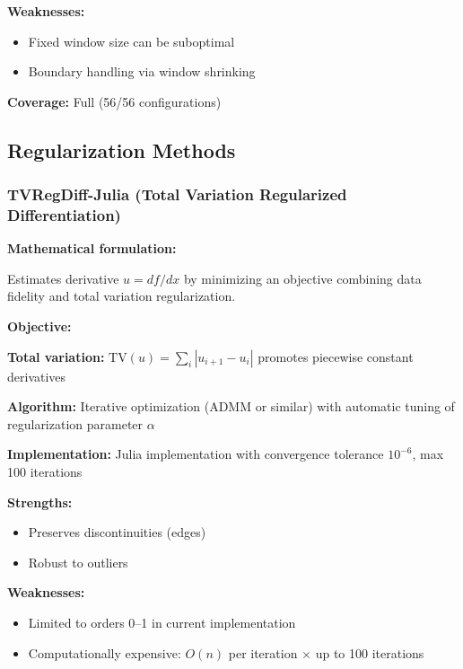 \textbf{Weaknesses:}
\begin{itemize}
    \item Fixed window size can be suboptimal
    \item Boundary handling via window shrinking
\end{itemize}

\textbf{Coverage:} Full (56/56 configurations)

\subsection{Regularization Methods}
\label{sec:regularization}

\subsubsection{TVRegDiff-Julia (Total Variation Regularized Differentiation)}

\textbf{Mathematical formulation:}

Estimates derivative $u = df/dx$ by minimizing an objective combining data fidelity and total variation regularization.

\textbf{Objective:} 

\textbf{Total variation:} $\text{TV}(u) = \sum_i |u_{i+1} - u_i|$ promotes piecewise constant derivatives

\textbf{Algorithm:} Iterative optimization (ADMM or similar) with automatic tuning of regularization parameter $\alpha$

\textbf{Implementation:} Julia implementation with convergence tolerance $10^{-6}$, max 100 iterations

\textbf{Strengths:}
\begin{itemize}
    \item Preserves discontinuities (edges)
    \item Robust to outliers
\end{itemize}

\textbf{Weaknesses:}
\begin{itemize}
    \item Limited to orders 0--1 in current implementation
    \item Computationally expensive: $O(n)$ per iteration $\times$ up to 100 iterations
\end{itemize}

